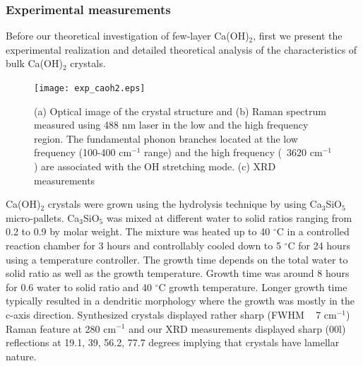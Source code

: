 \subsubsection{Experimental measurements}


Before our theoretical investigation of few-layer Ca(OH)$_{2}$, first we 
present the experimental realization and detailed theoretical analysis of the
characteristics of bulk Ca(OH)$_{2}$ crystals.


\begin{figure}[htbp]
\centering
\texttt{[image: exp\_caoh2.eps]}
\caption{\label{fig:exp_caoh2} (a) Optical image of the crystal structure and (b) Raman 
spectrum measured using 488 nm laser in the low and the high frequency region. 
The fundamental phonon branches located at the low frequency (100-400 cm$^{-1}$  range) and the high frequency (~3620 cm$^{-1}$) are associated with the OH  stretching mode. (c) XRD measurements}
\end{figure}

Ca(OH)$_{2}$ crystals were grown using the hydrolysis technique by using 
Ca$_{3}$SiO$_{5}$ micro-pallets. Ca$_{3}$SiO$_{5}$ was mixed at different water 
to solid ratios ranging from 0.2 to 0.9 by molar weight. The mixture was heated 
up to 40 $^{\circ}\mathrm{C}$ in a controlled reaction chamber for 3 hours and 
controllably cooled down to 5 $^{\circ}\mathrm{C}$ for 24 hours using a
temperature controller. The growth time depends on the total water to solid 
ratio as well as the growth temperature. Growth time was around 8 hours for 0.6 
water to solid ratio and 40 $^{\circ}\mathrm{C}$ growth temperature. 
Longer growth time typically resulted in a dendritic morphology where the 
growth was mostly in the c-axis direction. Synthesized crystals displayed rather sharp (FWHM ~ 7 cm$^{-1}$) Raman feature at 280 cm$^{-1}$ and our XRD measurements displayed sharp (00l) reflections at 19.1, 39, 56.2, 77.7 degrees implying that crystals have lamellar nature.  
 

